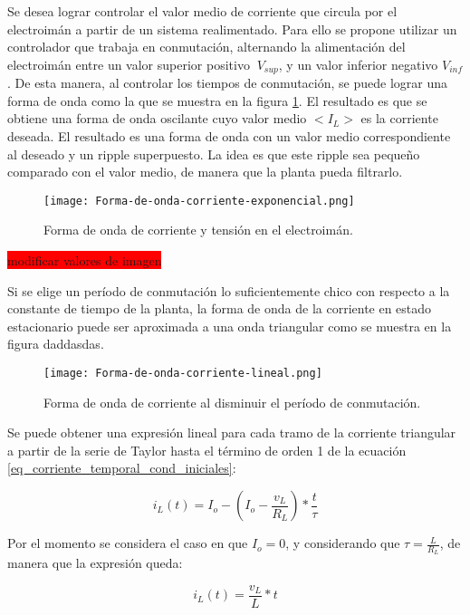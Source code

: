 Se desea lograr controlar el valor medio de corriente que circula por el electroimán a partir de un sistema realimentado. Para ello se propone utilizar un controlador que trabaja en conmutación, alternando la alimentación del electroimán entre un valor superior positivo $\ V_{sup}$, y un valor inferior negativo $V_{inf}$. De esta manera, al controlar los tiempos de conmutación, se puede lograr una forma de onda como la que se muestra en la figura  \ref{fig:img_corriente_exponencial}. El resultado es que se obtiene una forma de onda oscilante cuyo valor medio $<I_L>$ es la corriente deseada. El resultado es una forma de onda con un valor medio correspondiente al deseado y un ripple superpuesto. La idea es que este ripple sea pequeño comparado con el valor medio, de manera que la planta pueda filtrarlo. 

\begin{figure}[H]
	\centering
	\texttt{[image: Forma-de-onda-corriente-exponencial.png]}
	\caption{Forma de onda de corriente y tensión en el electroimán.}
	\label{fig:img_corriente_exponencial}
\end{figure}

\colorbox{red}{modificar valores de imagen}

Si se elige un período de conmutación lo suficientemente chico con respecto a la constante de tiempo de la planta, la forma de onda de la corriente en estado estacionario puede ser aproximada a una onda triangular como se muestra en la figura daddasdas.

\begin{figure}[H]
	\centering
	\texttt{[image: Forma-de-onda-corriente-lineal.png]}
	\caption{Forma de onda de corriente al disminuir el período de conmutación.}
	\label{fig:img_corriente_lineal}
\end{figure}

Se puede obtener una expresión lineal para cada tramo de la corriente triangular a partir de la serie de Taylor hasta el término de orden 1 de la ecuación \ref{eq_corriente_temporal_cond_iniciales}:

\begin{equation} \label{eq_corriente_taylor}
	i_L(t)=I_o -  (I_o-\frac{v_L}{R_L})*\frac{t}{\tau}
\end{equation}

Por el momento se considera el caso en que $I_o=0$, y considerando que $\tau=\frac{L}{R_L}$, de manera que la expresión queda:

\begin{equation} \label{eq_corriente_taylor_2}
	i_L(t)= \frac{v_L}{L}*t
\end{equation}

